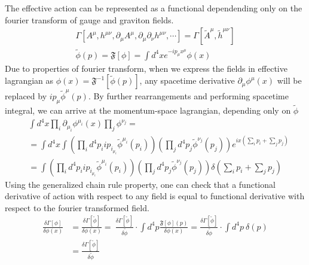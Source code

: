 \documentclass[11pt, a4paper]{article}
\begin{document}
The effective action can be represented as a functional dependending only on the fourier transform of gauge and graviton fields.
\begin{gather}
    \Gamma\left[ A^\mu, h^{\mu\nu}, \partial_\mu A^\mu, \partial_\mu \partial_\nu h^{\mu\nu}, \cdots\right] = \Gamma[ \tilde{A}^\mu, \tilde{h}^{\mu\nu}] \\
    \tilde{\phi}(p) = \mathfrak{F}[\phi] = \int d^4 x e^{-i p_\mu x^\mu} \phi(x)
\end{gather}
Due to properties of fourier transform, when we express the fields in effective lagrangian as $\phi(x) = \mathfrak{F}^{-1}[\tilde{\phi}(p)]$,
any spacetime derivative $\partial_\mu \phi^\mu(x)$ will be replaced by $i p_\mu \tilde{\phi}^\mu(p)$.
By further rearrangements and performing spacetime integral, we can arrive at the momentum-space lagrangian,
depending only on $\tilde{\phi}$
\begin{align}
    & \int d^4 x \prod_i \partial_{\mu_i} \phi^{\mu_i}(x) \prod_j \phi^{\nu_j} = \\
    & = \int d^4 x \int \left( \prod_i d^4 p_i i p_{i_{\mu_{i}}} \tilde{\phi}^{\mu_i}(p_i)\right)\left( \prod_j d^4 p_j \tilde{\phi}^{\nu_j}(p_j)\right) e^{i x \left(\sum_i p_i + \sum_j p_j \right)} \\
    & = \int \left( \prod_i d^4 p_i i p_{i_{\mu_{i}}} \tilde{\phi}^{\mu_i}(p_i)\right)\left( \prod_j d^4 p_j \tilde{\phi}^{\nu_j}(p_j)\right) \delta\left( \sum_i p_i + \sum_j p_j\right)
\end{align} %
Using the generalized chain rule property, one can check that a functional derivative of action with respect to any field is equal to functional derivative with respect to the fourier transformed field.
\begin{align}
    \frac{\delta \Gamma[\phi]}{\delta \phi (x)} & = \frac{\delta \Gamma[ \tilde{\phi}] }{\delta \phi(x)} = \ \frac{\delta \Gamma[ \tilde{\phi} ] }{\delta \tilde{\phi}} \cdot \int d^4 p \frac{\mathfrak{F}[\phi](p)}{\delta \phi(x)} = \frac{\delta \Gamma[ \tilde{\phi} ] }{\delta \tilde{\phi}} \cdot \int d^4 p \ \delta(p) \\
    & = \frac{\delta \Gamma[ \tilde{\phi} ] }{\delta \tilde{\phi}}
\end{align}

\end{document}
